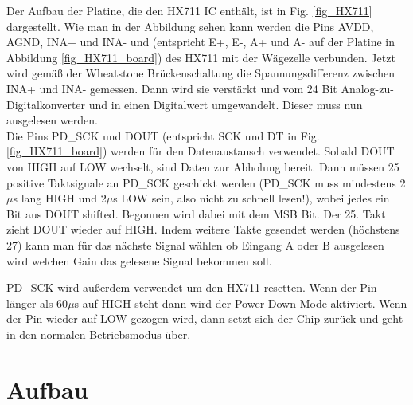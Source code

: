 \documentclass[12pt,journal]{IEEEtran}
\begin{document}
Der Aufbau der Platine, die den  HX711 IC enthält, ist in Fig. \ref{fig_HX711} dargestellt.
Wie man in der Abbildung sehen kann werden die Pins AVDD, AGND, INA+ und INA- und  (entspricht
E+, E-, A+ und A- auf der Platine in Abbildung \ref{fig_HX711_board}) des HX711 mit
der Wägezelle verbunden. Jetzt wird gemäß der Wheatstone Brückenschaltung die Spannungsdifferenz
zwischen INA+ und INA- gemessen. Dann wird sie verstärkt und vom 24 Bit Analog-zu-Digitalkonverter
und in einen Digitalwert umgewandelt. Dieser muss nun ausgelesen werden.\\
Die Pins PD\_SCK und DOUT (entspricht SCK und DT in Fig. \ref{fig_HX711_board}) werden für den Datenaustausch
verwendet. Sobald DOUT von HIGH auf LOW wechselt, sind Daten zur Abholung bereit.
Dann müssen 25 positive Taktsignale an PD\_SCK geschickt werden (PD\_SCK muss mindestens 2$\mu$s lang
HIGH und 2$\mu$s LOW sein, also nicht zu schnell lesen!), wobei jedes ein Bit aus DOUT shifted.
Begonnen wird dabei mit dem MSB Bit. Der 25. Takt zieht DOUT wieder auf HIGH.
Indem weitere Takte gesendet werden (höchstens 27) kann man für das nächste Signal wählen
ob Eingang A oder B ausgelesen wird welchen Gain das gelesene Signal bekommen soll. 

PD\_SCK wird außerdem verwendet um den HX711 resetten. Wenn der Pin länger als 60$\mu$s auf HIGH
steht dann wird der Power Down Mode aktiviert. Wenn der Pin wieder auf LOW gezogen wird,
dann setzt sich der Chip zurück und geht in den normalen Betriebsmodus über.

\section{Aufbau}
\end{document}
